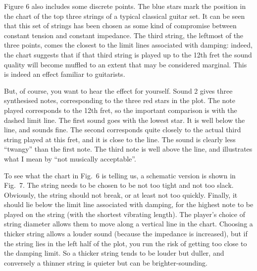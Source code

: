 
  Figure 6 also includes some discrete points. The blue stars mark the position 
  in the chart of the top three strings of a typical classical guitar set. It 
  can be seen that this set of strings has been chosen as some kind of 
  compromise between constant tension and constant impedance. The third string, 
  the leftmost of the three points, comes the closest to the limit lines 
  associated with damping: indeed, the chart suggests that if that third string 
  is played up to the 12th fret the sound quality will become muffled to an 
  extent that may be considered marginal. This is indeed an effect familiar to 
  guitarists. 

  But, of course, you want to hear the effect for yourself. Sound 2 gives three 
  synthesised notes, corresponding to the three red stars in the plot. The note 
  played corresponds to the 12th fret, so the important comparison is with the 
  dashed limit line. The first sound goes with the lowest star. It is well 
  below the line, and sounds fine. The second corresponds quite closely to the 
  actual third string played at this fret, and it is close to the line. The 
  sound is clearly less ``twangy'' than the first note. The third note is well 
  above the line, and illustrates what I mean by ``not musically acceptable''. 

\audio{}

  To see what the chart in Fig.\ 6 is telling us, a schematic version is shown 
  in Fig.\ 7. The string needs to be chosen to be not too tight and not too 
  slack. Obviously, the string should not break, or at least not too quickly. 
  Finally, it should lie below the limit line associated with damping, for the 
  highest note to be played on the string (with the shortest vibrating length). 
  The player's choice of string diameter allows them to move along a vertical 
  line in the chart. Choosing a thicker string allows a louder sound (because 
  the impedance is increased), but if the string lies in the left half of the 
  plot, you run the risk of getting too close to the damping limit. So a 
  thicker string tends to be louder but duller, and conversely a thinner string 
  is quieter but can be brighter-sounding. 

